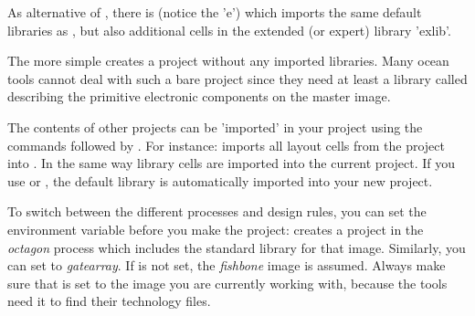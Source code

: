 As alternative of , there is  
(notice the 'e')
which imports the same default libraries as , but also additional 
cells in the extended (or expert) library 'exlib'.

The more simple
 creates a project without any imported
libraries. Many {\sc ocean} tools cannot deal with such a bare project since
they need at least a library called  describing the primitive
electronic components on the master image.

The contents of other projects can be 'imported' in your project using the
commands 
followed by . For instance:
imports all layout cells from the project  into
. In the same way library cells are imported into the current
project. If you use  or , the default library is
automatically imported into your new project. 

To switch between the different processes and design rules, you can set the
environment variable  
 before you make the project: \cd{}
creates a project in the {\sl octagon} process which includes the standard
library for that image. Similarly, you can set  to {\sl
gatearray}. If  is not set, the {\sl fishbone} image is
assumed. Always make sure that  is set to the image you
are currently working with, because the  tools need it to find
their technology files. 



